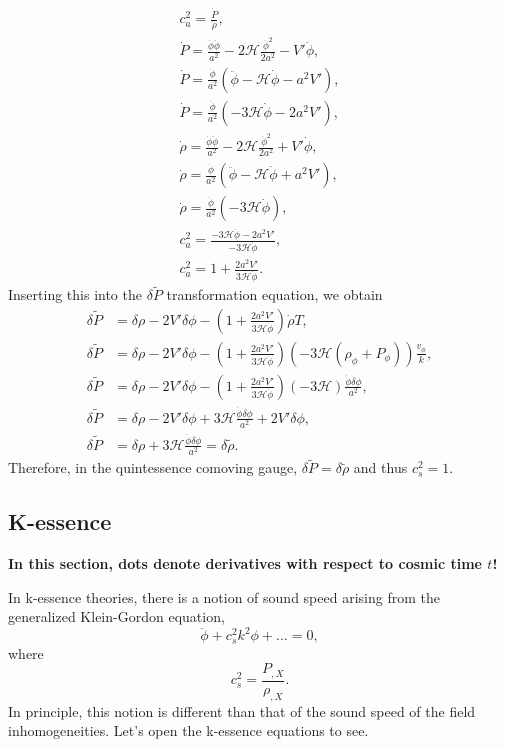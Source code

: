 \documentclass{article}
\begin{document}
\begin{align}
    c_a^2 = \frac{\dot P}{\dot\rho}, \\
    \dot P = \frac{\dot\phi \ddot\phi}{a^2} - 2\mathcal{H}\frac{\dot\phi^2}{2a^2} - V'\dot\phi, \\
    \dot P = \frac{\dot\phi}{a^2}\left( \ddot\phi - \mathcal{H}\dot\phi - a^2V'\right),\\
    \dot P = \frac{\dot\phi}{a^2}\left(  - 3\mathcal{H}\dot\phi - 2a^2V'\right),\\
    \dot \rho = \frac{\dot\phi \ddot\phi}{a^2} - 2\mathcal{H}\frac{\dot\phi^2}{2a^2} + V'\dot\phi, \\
    \dot \rho = \frac{\dot\phi}{a^2}\left( \ddot\phi - \mathcal{H}\dot\phi + a^2V'\right),\\
    \dot\rho = \frac{\dot\phi}{a^2}(-3\mathcal{H}\dot\phi), \\
    c_a^2 = \frac{-3\mathcal{H}\dot\phi - 2a^2V'}{-3\mathcal{H}\dot\phi}, \\
    c_a^2 = 1 + \frac{2a^2V'}{3\mathcal{H}\dot\phi}.
\end{align}
Inserting this into the $\delta \tilde P$ transformation equation, we obtain
\begin{align}
    \delta\tilde P &= \delta \rho - 2V'\delta\phi - \left( 1 + \frac{2a^2V'}{3\mathcal{H}\dot\phi}\right)\dot\rho T, \\
    \delta\tilde P &= \delta \rho - 2V'\delta\phi - \left( 1 + \frac{2a^2V'}{3\mathcal{H}\dot\phi}\right)(-3\mathcal{H}(\rho_\phi + P_\phi))\frac{v_\phi}{k}, \\
    \delta\tilde P &= \delta \rho - 2V'\delta\phi - \left( 1 + \frac{2a^2V'}{3\mathcal{H}\dot\phi}\right)(-3\mathcal{H})\frac{\dot\phi\delta\phi}{a^2}, \\
    \delta\tilde P &= \delta \rho - 2V'\delta\phi + 3\mathcal{H}\frac{\dot\phi\delta\phi}{a^2} + 2V'\delta\phi, \\
    \delta\tilde P &= \delta \rho + 3\mathcal{H}\frac{\dot\phi\delta\phi}{a^2} = \delta\tilde\rho.
\end{align}
Therefore, in the quintessence comoving gauge, $\delta\tilde P = \delta\tilde\rho$ and thus $c_s^2 = 1$.

\subsection{K-essence}
\textbf{In this section, dots denote derivatives with respect to cosmic time $t$!}

In k-essence theories, there is a notion of sound speed arising from the generalized Klein-Gordon equation,
\begin{equation}
    \ddot\phi + c_s^2k^2\phi + ... = 0,
\end{equation}
where
\begin{equation}
    c_s^2 = \frac{P_{,X}}{\rho_{,X}}.
\end{equation}
In principle, this notion is different than that of the sound speed of the field inhomogeneities. Let's open the k-essence equations to see.
\end{document}
